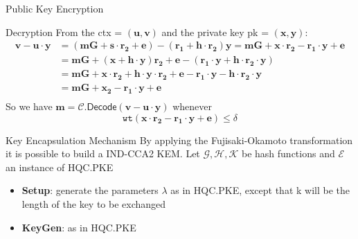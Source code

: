 \begin{frame}{Public Key Encryption}
    \begin{block}{Decryption}
        From the \textsf{ctx} = $(\mathbf{u, v})$ and the private key \textsf{pk} = $(\mathbf{x, y})$:
        \begin{equation*}
            \begin{aligned}
                \mathbf{v - u\cdot y} & \mathbf{ = (mG +s\cdot r_2 + e) - (r_1 + h\cdot r_2)y = mG + x\cdot r_2 -r_1\cdot y + e}\\
                &\mathbf{ = mG + (x + h\cdot y)r_2 + e - (r_1\cdot y  + h\cdot r_2\cdot y)}\\
                &\mathbf{ = mG + x\cdot r_2 + h\cdot y\cdot r_2 + e - r_1\cdot y - h\cdot r_2\cdot y}\\
                &\mathbf{ = mG + x_2 - r_1\cdot y + e}\\
            \end{aligned}
        \end{equation*}
        So we have $\mathbf{m} = \mathcal{C}.\textsf{Decode}(\mathbf{v - u\cdot y})$ whenever
        \begin{equation*}
            \mathtt{wt}(\mathbf{x\cdot r_2 - r_1\cdot y + e}) \leq \delta
        \end{equation*}
    \end{block}
\end{frame}

\begin{frame}{Key Encapsulation Mechanism}
    By applying the Fujisaki-Okamoto transformation it is possible to build a IND-CCA2 KEM.
    Let $\mathcal{G, H, K}$ be hash functions and $\mathcal{E}$ an instance of \textsf{HQC.PKE}
    \begin{block}{}
        \begin{itemize}
            \item \textbf{Setup}: generate the parameters $\lambda$ as in \textsf{HQC.PKE}, except that k will be the length of the key to be exchanged
            \item \textbf{KeyGen}: as in \textsf{HQC.PKE}
        \end{itemize}
    \end{block}
\end{frame}

